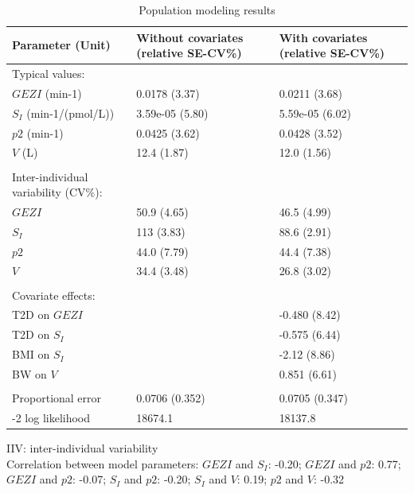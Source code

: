 \documentclass[utf8]{frontiersSCNS} %
\begin{document}
\begin{table}[h]
\caption{Population modeling results}
\label{tab:prm estimates}
\begin{tabular}{lll}
\hline
Parameter (Unit)    & Without covariates (relative SE-CV\%) & With covariates (relative SE-CV\%) \\ \hline
Typical values: \\
$GEZI$ (min-1)                  & 0.0178 (3.37) & 0.0211 (3.68) \\
$S_I$ (min-1/(pmol/L)) & 3.59e-05 (5.80)                          & 5.59e-05 (6.02)                        \\
$p2$ (min-1)                    & 0.0425 (3.62) & 0.0428 (3.52) \\
$V$ (L)                         & 12.4 (1.87)   & 12.0 (1.56)   \\
                              &               &               \\
Inter-individual variability (CV\%): \\
$GEZI$                      & 50.9 (4.65)   & 46.5 (4.99)   \\
$S_I$                        & 113 (3.83)    & 88.6 (2.91)   \\
$p2$                        & 44.0 (7.79)   & 44.4 (7.38)   \\
$V$                         & 34.4 (3.48)   & 26.8 (3.02)   \\
                              &               &               \\
Covariate effects: &               &               \\
T2D on $GEZI$                  &               & -0.480 (8.42) \\
T2D on $S_I$                     &               & -0.575 (6.44) \\
BMI on $S_I$                     &               & -2.12 (8.86)  \\
BW on $V$                       &               & 0.851 (6.61)  \\ 

                              &               &               \\
Proportional error  & 0.0706 (0.352)                            & 0.0705 (0.347)                         \\

-2 log likelihood             & 18674.1       & 18137.8       \\ \hline
\end{tabular}
IIV: inter-individual variability\\
Correlation between model parameters: $GEZI$ and $S_I$: -0.20; $GEZI$ and $p2$: 0.77; $GEZI$ and $p2$: -0.07; $S_I$ and $p2$: -0.20; $S_I$ and $V$: 0.19; $p2$ and $V$: -0.32
\end{table}
\end{document}
